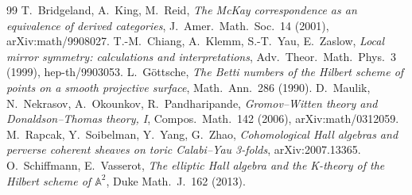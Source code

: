 \begin{thebibliography}{99}
 T.~Bridgeland, A.~King, M.~Reid,
\emph{The McKay correspondence as an equivalence of derived categories},
J.~Amer.~Math.~Soc.~14 (2001), arXiv:math/9908027.
 T.-M.~Chiang, A.~Klemm, S.-T.~Yau, E.~Zaslow,
\emph{Local mirror symmetry: calculations and interpretations},
Adv.~Theor.~Math.~Phys.~3 (1999), hep-th/9903053.
 L.~G\"ottsche,
\emph{The Betti numbers of the Hilbert scheme of points on a smooth
projective surface}, Math.~Ann.~286 (1990).
 D.~Maulik, N.~Nekrasov, A.~Okounkov, R.~Pandharipande,
\emph{Gromov--Witten theory and Donaldson--Thomas theory, I},
Compos.~Math.~142 (2006), arXiv:math/0312059.
 M.~Rapcak, Y.~Soibelman, Y.~Yang, G.~Zhao,
\emph{Cohomological Hall algebras and perverse coherent sheaves on
toric Calabi--Yau 3-folds}, arXiv:2007.13365.
 O.~Schiffmann, E.~Vasserot,
\emph{The elliptic Hall algebra and the K-theory of the Hilbert scheme
of \(\mathbb A^2\)}, Duke Math.~J.~162 (2013).
\end{thebibliography}
